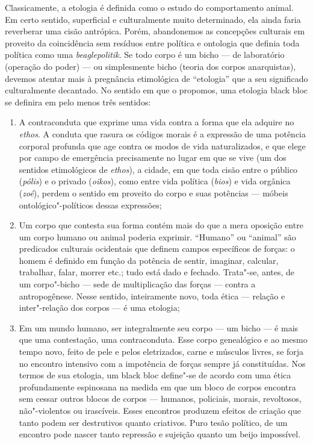 Classicamente, a etologia é definida como o estudo do comportamento
animal. Em certo sentido, superficial e culturalmente muito determinado,
ela ainda faria reverberar uma cisão antrópica. Porém, abandonemos as
concepções culturais em proveito da coincidência sem resíduos entre
política e ontologia que definia toda política como uma
\emph{beaglepolitik}. Se todo corpo é um bicho --- de laboratório
(operação do poder) --- ou simplesmente bicho (teoria dos corpos
anarquistas), devemos atentar mais à pregnância etimológica de
``etologia'' que a seu significado culturalmente decantado. No sentido
em que o propomos, uma etologia black bloc se definira em pelo menos
três sentidos:

\begin{enumerate}
\item A contraconduta que exprime uma vida contra a forma que ela adquire
no \emph{ethos}. A conduta que rasura os códigos morais é a expressão de
uma potência corporal profunda que age contra os modos de vida
naturalizados, e que elege por campo de emergência precisamente no lugar
em que se vive (um dos sentidos etimológicos de \emph{ethos}), a cidade,
em que toda cisão entre o público (\emph{pólis}) e o privado
(\emph{oikos}), como entre vida política (\emph{bios}) e vida orgânica
(\emph{zoé}), perdem o sentido em proveito do corpo e suas potências ---
móbeis ontológico"-políticos dessas expressões;

\item Um corpo que contesta sua forma contém mais do que a mera oposição
entre um corpo humano ou animal poderia exprimir. ``Humano'' ou
``animal'' são predicados culturais ocidentais que definem campos
específicos de forças: o homem é definido em função da potência de
sentir, imaginar, calcular, trabalhar, falar, morrer etc.; tudo está
dado e fechado. Trata"-se, antes, de um corpo"-bicho --- sede de
multiplicação das forças --- contra a antropogênese. Nesse sentido,
inteiramente novo, toda ética --- relação e inter"-relação dos corpos --- é
uma etologia;

\item Em um mundo humano, ser integralmente seu corpo --- um bicho --- é mais
que uma contestação, uma contraconduta. Esse corpo genealógico e ao
mesmo tempo novo, feito de pele e pelos eletrizados, carne e músculos
livres, se forja no encontro intensivo com a impotência de forças sempre
já constituídas. Nos termos de sua etologia, um black bloc define"-se de
acordo com uma ética profundamente espinosana na medida em que um bloco
de corpos encontra sem cessar outros blocos de corpos --- humanos,
policiais, morais, revoltosos, não"-violentos ou irascíveis. Esses
encontros produzem efeitos de criação que tanto podem ser destrutivos
quanto criativos. Puro tesão político, de um encontro pode nascer tanto
repressão e sujeição quanto um beijo \mbox{impossível}.
\end{enumerate}

